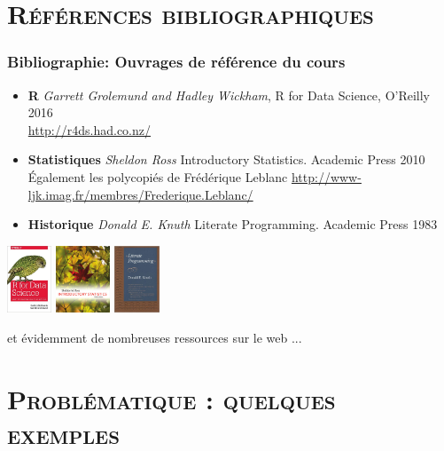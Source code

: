 \documentclass[xcolor=x11names,compress,8pt]{beamer}
\renewcommand{\(}{\begin{columns}}
\renewcommand{\)}{\end{columns}}
\newcommand{\<}[1]{\begin{column}{#1}}
\renewcommand{\>}{\end{column}}
\begin{document}
\section[{\scshape Références}]{{\scshape Références bibliographiques} }
\begin{frame}
\frametitle{Bibliographie: Ouvrages de référence du cours}
\begin{itemize}
\item  \textbf{R} \textit{Garrett Grolemund and Hadley Wickham}, R for Data Science, O'Reilly 2016 \\
  \url{http://r4ds.had.co.nz/}
\item \textbf{Statistiques} \textit{Sheldon Ross} Introductory Statistics. Academic Press 2010\\
Également les polycopiés de Frédérique Leblanc \url{http://www-ljk.imag.fr/membres/Frederique.Leblanc/}
\item \textbf{Historique} \textit{Donald E. Knuth} Literate Programming. Academic Press 1983
\end{itemize}
\centerline{
\includegraphics[height=2cm]{Wickham.png}  \hspace{1cm} \includegraphics[height=2cm]{Ross.png}  \hspace{1cm} \includegraphics[height=2cm]{Knuth-Lit.png} 
}

et évidemment de nombreuses ressources sur le web ...
\end{frame} 
\section[{\scshape Problématique}]{{\scshape Problématique : quelques exemples} }
\end{document}
